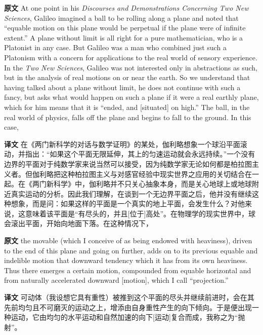 \documentclass[UTF8,zihao=-4]{ctexart}
\newcommand{\BodyFont}{\fontsize{10.5pt}{15.5pt}\selectfont}
\renewenvironment{quote}{\par\noindent\begingroup\BodyFont}{\par\endgroup}
\begin{document}
\noindent\textbf{原文} At one point in his \emph{Discourses and Demonstrations Concerning Two New Sciences}, Galileo imagined a ball to be rolling along a plane and noted that ``equable motion on this plane would be perpetual if the plane were of infinite extent.'' A plane without limit is all right for a pure mathematician, who is a Platonist in any case. But Galileo was a man who combined just such a Platonism with a concern for applications to the real world of sensory experience. In the \emph{Two New Sciences}, Galileo was not interested only in abstractions as such, but in the analysis of real motions on or near the earth. So we understand that having talked about a plane without limit, he does not continue with such a fancy, but asks what would happen on such a plane if it were a real earthly plane, which for him means that it is ``ended, and [situated] on high.'' The ball, in the real world of physics, falls off the plane and begins to fall to the ground. In this case,
\par\noindent\textbf{译文} 在《两门新科学的对话与数学证明》的某处，伽利略想象一个球沿平面滚动，并指出：“如果这个平面无限延伸，其上的匀速运动就会永远持续。”一个没有边界的平面对于纯数学家来说当然可以接受，因为纯数学家无论如何都是柏拉图主义者。但伽利略把这种柏拉图主义与对感官经验中现实世界之应用的关切结合在一起。在《两门新科学》中，伽利略并不只关心抽象本身，而是关心地球上或地球附近真实运动的分析。因此我们理解，在谈到一个无边界平面之后，他并没有继续这种想象，而是问：如果这样的平面是一个真实的地上平面，会发生什么？对他来说，这意味着该平面是“有尽头的，并且[位于]高处”。在物理学的现实世界中，球会滚出平面，开始向地面下落。在这种情况下，
\medskip

\begin{quote}
\noindent\textbf{原文} the movable (which I conceive of as being endowed with heaviness), driven to the end of this plane and going on further, adds on to its previous equable and indelible motion that downward tendency which it has from its own heaviness. Thus there emerges a certain motion, compounded from equable horizontal and from naturally accelerated downward [motion], which I call ``projection.''
\par\noindent\textbf{译文} 可动体（我设想它具有重性）被推到这个平面的尽头并继续前进时，会在其先前均匀且不可磨灭的运动之上，增添由自身重性产生的向下倾向。于是便出现一种运动，它由均匀的水平运动和自然加速的向下[运动]复合而成，我称之为“抛射”。
\end{quote}
\end{document}

